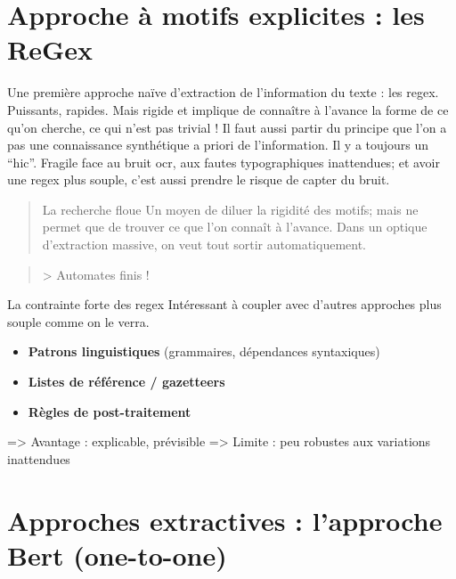 \section{Approche à motifs explicites : les ReGex}

Une première approche naïve d'extraction de l'information du texte : les regex. Puissants, rapides. Mais rigide et implique de connaître à l'avance la forme de ce qu'on cherche, ce qui n'est pas trivial ! Il faut aussi partir du principe que l'on a pas une connaissance synthétique a priori de l'information. Il y a toujours un \enquote{hic}. Fragile face au bruit ocr, aux fautes typographiques inattendues; et avoir une regex plus souple, c'est aussi prendre le risque de capter du bruit.

\begin{quote}La recherche floue Un moyen de diluer la rigidité des motifs; mais ne permet que de trouver ce que l'on connaît à l'avance. Dans un optique d'extraction massive, on veut tout sortir automatiquement.\end{quote}
\begin{quote}\end{quote}
\begin{quote}> Automates finis !\end{quote}

La contrainte forte des regex Intéressant à coupler avec d'autres approches plus souple comme on le verra.

\begin{itemize}
\item \textbf{Patrons linguistiques} (grammaires, dépendances syntaxiques)
\end{itemize}

\begin{itemize}
\item \textbf{Listes de référence / gazetteers}
\end{itemize}

\begin{itemize}
\item \textbf{Règles de post-traitement}  
\end{itemize}
  => Avantage : explicable, prévisible  
  => Limite : peu robustes aux variations inattendues

\section{Approches extractives : l'approche Bert (one-to-one)}

